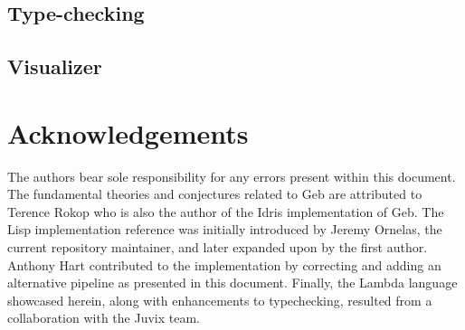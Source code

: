 \subsection{Type-checking}
\subsection{Visualizer}

\section*{Acknowledgements}
The authors bear sole responsibility for any errors present within this
document. The fundamental theories and conjectures related to Geb are
attributed to Terence Rokop who is also the author of the Idris implementation of Geb. The Lisp implementation reference was
initially introduced by Jeremy Ornelas, the current repository maintainer,
and later expanded upon by the first author. Anthony Hart contributed to
the implementation by correcting and adding an alternative pipeline as
presented in this document. Finally, the Lambda language showcased herein,
along with enhancements to typechecking, resulted from a collaboration with
the Juvix team.
\nocite{*}



